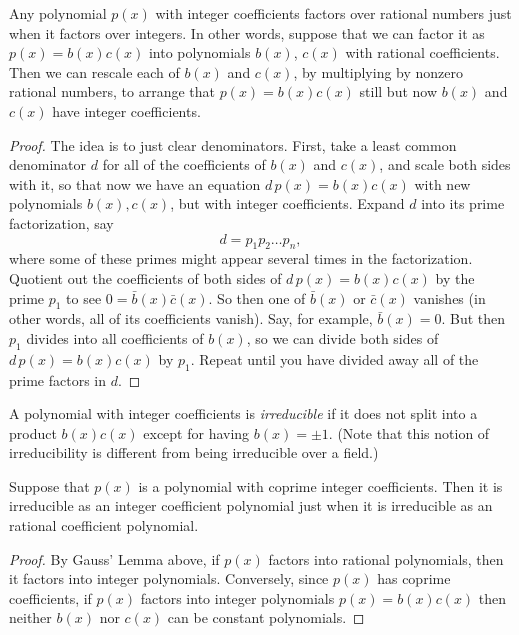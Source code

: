 \begin{lemma}
Any polynomial \(p(x)\) with integer coefficients factors over rational numbers just when it factors over integers.
In other words, suppose that we can factor it as \(p(x)=b(x)c(x)\) into polynomials \(b(x)\), \(c(x)\) with rational coefficients.
Then we can rescale each of \(b(x)\) and \(c(x)\), by multiplying by nonzero rational numbers, to arrange that \(p(x)=b(x)c(x)\) still but now \(b(x)\) and \(c(x)\) have integer coefficients.
\end{lemma}
\begin{proof}
The idea is to just clear denominators.
First, take a least common denominator \(d\) for all of the coefficients of \(b(x)\) and \(c(x)\), and scale both sides with it, so that now we have an equation \(d \, p(x)=b(x)c(x)\) with new polynomials \(b(x), c(x)\), but with integer coefficients.
Expand \(d\) into its prime factorization, say
\[
d=p_1 p_2 \dots p_n, 
\]
where some of these primes might appear several times in the factorization.
Quotient out the coefficients of both sides of \(d \, p(x)=b(x)c(x)\) by the prime \(p_1\) to see \(0=\bar{b}(x)\bar{c}(x)\).
So then one of \(\bar{b}(x)\) or \(\bar{c}(x)\) vanishes (in other words, all of its coefficients vanish).
Say, for example, \(\bar{b}(x)=0\).
But then \(p_1\) divides into all coefficients of \(b(x)\), so we can divide both sides of \(d \, p(x)=b(x)c(x)\) by \(p_1\).
Repeat until you have divided away all of the prime factors in \(d\).
\end{proof}
A polynomial with integer coefficients is \emph{irreducible}%
%
% 
%
if it does not split into a product \(b(x)c(x)\) except for having \(b(x)=\pm 1\).
(Note that this notion of irreducibility is different from being irreducible over a field.)
\begin{corollary}\label{corollary:coprime.coeffs}
Suppose that \(p(x)\) is a polynomial with coprime integer coefficients.
Then it is irreducible as an integer coefficient polynomial just when it is irreducible as an rational coefficient polynomial.
\end{corollary}
\begin{proof}
By Gauss' Lemma above, if \(p(x)\) factors into rational polynomials, then it factors into integer polynomials.
Conversely, since \(p(x)\) has coprime coefficients, if \(p(x)\) factors into integer polynomials \(p(x) = b(x)c(x)\) then neither \(b(x)\) nor \(c(x)\) can be constant polynomials. 
\end{proof}
